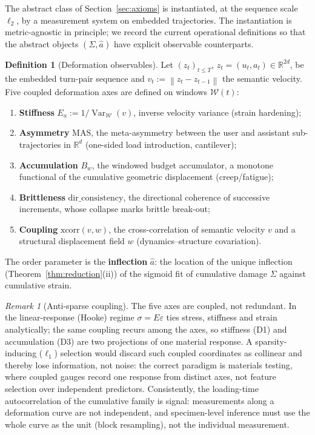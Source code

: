 \documentclass[11pt]{article}
\theoremstyle{plain}
\theoremstyle{definition}
\newtheorem{definition}[theorem]{Definition}
\theoremstyle{remark}
\newtheorem{remark}[theorem]{Remark}
\DeclareMathOperator{\Var}{Var}
\newcommand{\R}{\mathbb{R}}
\newcommand{\norm}[1]{\left\lVert#1\right\rVert}
\begin{document}
The abstract class of Section~\ref{sec:axioms} is instantiated, at the sequence scale $\ell_2$, by a measurement system on embedded trajectories. The instantiation is metric-agnostic in principle; we record the current operational definitions so that the abstract objects $(\Sigma,\hat a)$ have explicit observable counterparts.

\begin{definition}[Deformation observables]\label{def:axes}
Let $(z_t)_{t\le T}$, $z_t=(u_t,a_t)\in\R^{2d}$, be the embedded turn-pair sequence and $v_t:=\norm{z_t-z_{t-1}}$ the semantic velocity. Five coupled deformation axes are defined on windows $\mathcal W(t)$:
\begin{enumerate}[label=\textnormal{(D\arabic*)},leftmargin=3em]
\item \textbf{Stiffness} $E_a:=1/\Var_{\mathcal W}(v)$, inverse velocity variance (strain hardening);
\item \textbf{Asymmetry} $\mathrm{MAS}$, the meta-asymmetry between the user and assistant sub-trajectories in $\R^{d}$ (one-sided load introduction, cantilever);
\item \textbf{Accumulation} $B_w$, the windowed budget accumulator, a monotone functional of the cumulative geometric displacement (creep/fatigue);
\item \textbf{Brittleness} $\mathrm{dir\_consistency}$, the directional coherence of successive increments, whose collapse marks brittle break-out;
\item \textbf{Coupling} $\mathrm{xcorr}(v,w)$, the cross-correlation of semantic velocity $v$ and a structural displacement field $w$ (dynamics--structure covariation).
\end{enumerate}
The order parameter is the \textbf{inflection} $\hat a$: the location of the unique inflection (Theorem~\ref{thm:reduction}(ii)) of the sigmoid fit of cumulative damage $\Sigma$ against cumulative strain.
\end{definition}

\begin{remark}[Anti-sparse coupling]\label{rem:antisparse}
The five axes are coupled, not redundant. In the linear-response (Hooke) regime $\sigma=E\varepsilon$ ties stress, stiffness and strain analytically; the same coupling recurs among the axes, so stiffness (D1) and accumulation (D3) are two projections of one material response. A sparsity-inducing ($\ell_1$) selection would discard such coupled coordinates as collinear and thereby lose information, not noise: the correct paradigm is materials testing, where coupled gauges record one response from distinct axes, not feature selection over independent predictors. Consistently, the loading-time autocorrelation of the cumulative family is signal: measurements along a deformation curve are not independent, and specimen-level inference must use the whole curve as the unit (block resampling), not the individual measurement.
\end{remark}
\end{document}
